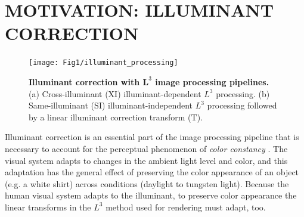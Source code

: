\documentclass[]{spie}
\newcommand{\Lcube}{L^3}
\newcommand{\XI}{\mathrm{XI}}
\newcommand{\SI}{\mathrm{SI}}
\newcommand{\TT}{\mathrm{T}}
\begin{document}


\section{MOTIVATION: ILLUMINANT CORRECTION}

\begin{figure}
\begin{center}
 \texttt{[image: Fig1/illuminant\_processing]}
\end{center}
\caption{ \textbf{Illuminant correction with $\boldsymbol\Lcube$ image processing pipelines.} (a) Cross-illuminant ($\XI$) illuminant-dependent $\Lcube$ processing. (b) Same-illuminant ($\SI$) illuminant-independent $\Lcube$ processing followed by a linear illuminant correction transform ($\TT$).}
\label{fig:sensordisplay}
\end{figure}

Illuminant correction is an essential part of the image processing pipeline that is necessary to account for the perceptual phenomenon of \textit{color constancy} \cite{Wandell1995}. The visual system adapts to changes in the ambient light level and color, and this adaptation has the general effect of preserving the color appearance of an object (e.g. a white shirt) across conditions (daylight to tungsten light). Because the human visual system adapts to the illuminant, to preserve color appearance the linear transforms in the $\Lcube$ method used for rendering must adapt, too.
\end{document}
